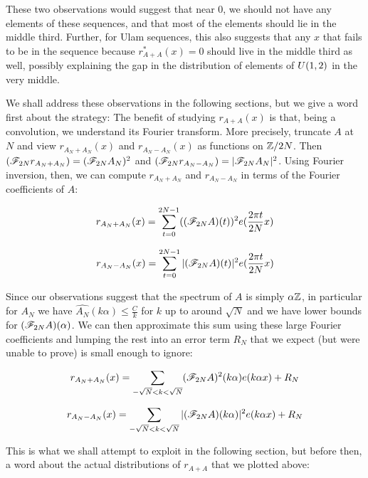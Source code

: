 \documentclass{article}
\theoremstyle{definition}
\theoremstyle{remark}
\numberwithin{equation}{section}
\begin{document}
These two observations would suggest that near 0, we should not have
any elements of these sequences, and that most of the elements should
lie in the middle third.  Further, for Ulam sequences, this also
suggests that any $x$ that fails to be in the sequence because
$r^*_{A+A}(x) = 0$ should live in the middle third as well, possibly
explaining the gap in the distribution of elements of $U(1,2)$ in the
very middle.  

We shall address these observations in the following sections, but we
give a word first about the strategy: The benefit of studying
$r_{A+A}(x)$ is that, being a convolution, we understand its Fourier
transform.  More precisely, truncate $A$ at $N$ and view
$r_{A_N + A_N}(x)$ and $r_{A_N - A_N}(x)$ as functions on $\mathbb{Z}/2N$.
Then $(\mathscr{F}_{2N}r_{A_N + A_N}) = (\mathscr{F}_{2N}A_N)^2$ and
$(\mathscr{F}_{2N}r_{A_N - A_N}) = |\mathscr{F}_{2N}A_N|^2$.  Using Fourier
inversion, then, we can compute $r_{A_N + A_N}$ and $r_{A_N - A_N}$ in
terms of the Fourier coefficients of $A$:

\begin{equation}\label{eqn:rAAsum}r_{A_N + A_N}(x) = \sum_{t=0}^{2N-1} ((\mathscr{F}_{2N}A)(t))^2 e(\frac{2\pi t}{2N} x)\end{equation}

\begin{equation}\label{eqn:rAAdiff}r_{A_N - A_N}(x) = \sum_{t=0}^{2N-1} |(\mathscr{F}_{2N}A)(t)|^2 e(\frac{2\pi t}{2N} x)\end{equation}

Since our observations suggest that the spectrum of $A$ is simply
$\alpha\mathbb{Z}$, in particular for $A_N$ we have
$\widehat{A_N}(k\alpha) \leq \frac{C}{k}$ for $k$ up to around
$\sqrt{N}$ and we have lower bounds for $(\mathscr{F}_{2N}A)(\alpha)$.  We
can then approximate this sum using these large Fourier coefficients
and lumping the rest into an error term $R_N$ that we expect (but were
unable to prove) is small enough to ignore:

\begin{equation}\label{eqn:rAAsum_err}
  r_{A_N + A_N}(x) = \sum_{-\sqrt{N} < k < \sqrt{N}}
  (\mathscr{F}_{2N}A)^2(k \alpha) e(k\alpha x) + R_N
\end{equation}

\begin{equation}\label{eqn:rAAdiff_err}
  r_{A_N - A_N}(x) = \sum_{-\sqrt{N} < k < \sqrt{N}} |(\mathscr{F}_{2N}A)(k\alpha)|^2 e(k\alpha x) + R_N
\end{equation}

This is what we shall attempt to exploit in the following section, but
before then, a word about the actual distributions of $r_{A+A}$ that
we plotted above: 
\end{document}

